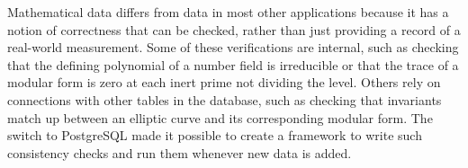 \documentclass{article}
\begin{document}
Mathematical data differs from data in most other applications because it has a notion of correctness that can be checked, rather than just providing a record of a real-world measurement.
Some of these verifications are internal, such as checking that the defining polynomial of a number field is irreducible or that the trace of a modular form is zero at each inert prime not dividing the level.
Others rely on connections with other tables in the database, such as checking that invariants match up between an elliptic curve and its corresponding modular form.
The switch to PostgreSQL made it possible to create a framework to write such consistency checks and run them whenever new data is added.



\end{document}
